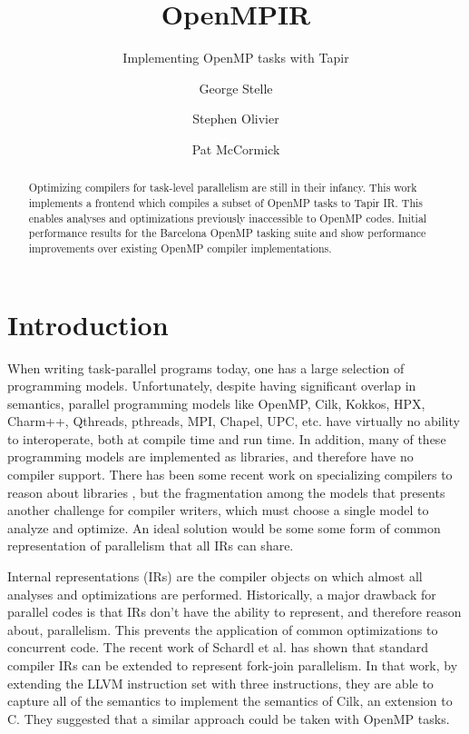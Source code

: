 \documentclass[sigconf]{acmart}
\begin{document}
\title{OpenMPIR}
\subtitle{Implementing OpenMP tasks with Tapir}
\author{George Stelle}

\author{Stephen Olivier}

\author{Pat McCormick}

\begin{abstract}
Optimizing compilers for task-level parallelism are still in their infancy.
This work implements a frontend which compiles a subset of OpenMP tasks to
Tapir IR. This enables analyses and optimizations previously inaccessible to
OpenMP codes. Initial performance results for the Barcelona OpenMP tasking
suite and show performance improvements over existing OpenMP compiler
implementations. 
\end{abstract}

\maketitle

\section{Introduction}

When writing task-parallel programs today, one has a large selection of
programming models. Unfortunately, despite having significant overlap in
semantics, parallel programming models like OpenMP, Cilk, Kokkos, HPX, Charm++,
Qthreads, pthreads, MPI, Chapel, UPC, etc. have virtually no ability to
interoperate, both at compile time and run time. In addition, many of these
programming models are implemented as libraries, and therefore have no compiler
support. There has been some recent work on specializing compilers to reason
about libraries \cite{kokkos}, but the fragmentation among the models that
presents another challenge for compiler writers, which must choose a single
model to analyze and optimize. An ideal solution would be some some form of
common representation of parallelism that all IRs can share.

Internal representations (IRs) are the compiler objects on which almost all
analyses and optimizations are performed. Historically, a major drawback for
parallel codes is that IRs don't have the ability to represent, and therefore
reason about, parallelism. This prevents the application of common
optimizations to concurrent code. The recent work of Schardl et al.
\cite{shardl2017} has shown that standard compiler IRs can be extended to
represent fork-join parallelism. In that work, by extending the LLVM
instruction set with three instructions, they are able to capture all of the
semantics to implement the semantics of Cilk, an extension to C. They suggested
that a similar approach could be taken with OpenMP tasks.
\end{document}
